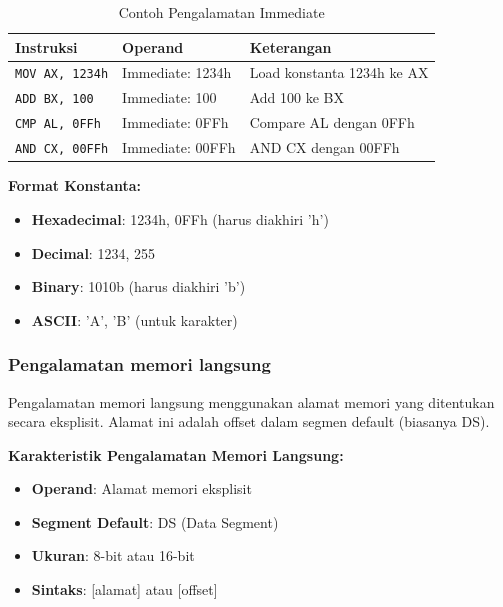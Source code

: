 \begin{table}[h]
\centering
\caption{Contoh Pengalamatan Immediate}
\begin{tabular}{|p{4cm}|p{4cm}|p{7cm}|}
\hline
\textbf{Instruksi} & \textbf{Operand} & \textbf{Keterangan} \\
\hline
\texttt{MOV AX, 1234h} & Immediate: 1234h & Load konstanta 1234h ke AX \\
\hline
\texttt{ADD BX, 100} & Immediate: 100 & Add 100 ke BX \\
\hline
\texttt{CMP AL, 0FFh} & Immediate: 0FFh & Compare AL dengan 0FFh \\
\hline
\texttt{AND CX, 00FFh} & Immediate: 00FFh & AND CX dengan 00FFh \\
\hline
\end{tabular}
\label{tab:immediate-addressing-examples}
\end{table}

\textbf{Format Konstanta:}
\begin{itemize}
    \item \textbf{Hexadecimal}: 1234h, 0FFh (harus diakhiri 'h')
    \item \textbf{Decimal}: 1234, 255
    \item \textbf{Binary}: 1010b (harus diakhiri 'b')
    \item \textbf{ASCII}: 'A', 'B' (untuk karakter)
\end{itemize}

\subsubsection{Pengalamatan memori langsung}
Pengalamatan memori langsung menggunakan alamat memori yang ditentukan secara eksplisit. Alamat ini adalah offset dalam segmen default (biasanya DS).

\textbf{Karakteristik Pengalamatan Memori Langsung:}
\begin{itemize}
    \item \textbf{Operand}: Alamat memori eksplisit
    \item \textbf{Segment Default}: DS (Data Segment)
    \item \textbf{Ukuran}: 8-bit atau 16-bit
    \item \textbf{Sintaks}: [alamat] atau [offset]
\end{itemize}

